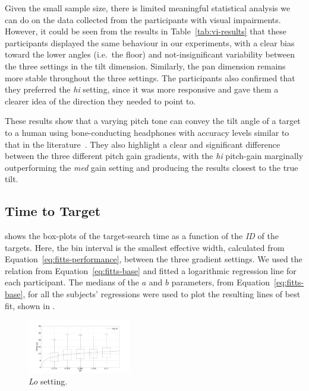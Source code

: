 \documentclass[sigconf, screen=true, anonymous=true]{acmart}
\begin{document}
Given the small sample size, there is limited meaningful statistical analysis we can do on the data collected from the participants with visual impairments.
However, it could be seen from the results in Table~\ref{tab:vi-results} that these participants displayed the same behaviour in our experiments, with a clear bias toward the lower angles (i.e.\ the floor) and not-insignificant variability between the three settings in the tilt dimension.
Similarly, the pan dimension remains more stable throughout the three settings.
The participants also confirmed that they preferred the \emph{hi} setting, since it was more responsive and gave them a clearer idea of the direction they needed to point to. 

These results show that a varying pitch tone can convey the tilt angle of a target to a human using bone-conducting headphones with accuracy levels similar to that in the literature~\cite{bujacz2011sonification, katz2011spatial, zotkin2004rendering}. They also highlight a clear and significant difference between the three different pitch gain gradients, with the \emph{hi} pitch-gain marginally outperforming the \emph{med} gain setting and producing the results closest to the true tilt. 

\subsection{Time to Target}

 shows the box-plots of the target-search time as a function of the \emph{ID} of the targets.
Here, the bin interval is the smallest effective width, calculated from Equation~\ref{eq:fitts-performance}, between the three gradient settings.
We used the relation from Equation~\ref{eq:fitts-base} and fitted a logarithmic regression line for each participant.
The medians of the $a$ and $b$ parameters, from Equation~\ref{eq:fitts-base}, for all the subjects' regressions were used to plot the resulting lines of best fit, shown in . 

\begin{figure}
  \centering
  \includegraphics[clip, trim=120 20 120 20, width=0.4\textwidth]{figures/fitts_lo.png}
  \caption{\emph{Lo} setting. }\label{fig:fitts-lo}
\end{figure}
\end{document}
